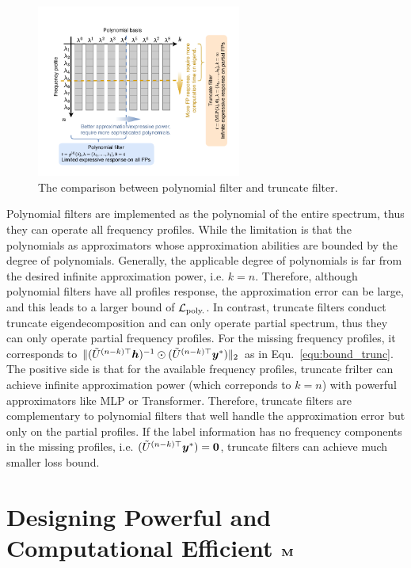 \documentclass{article} %
\begin{document}
	\begin{figure}[h]
		\centering
		\includegraphics[width=0.6\textwidth]{figure/poly_trunc}
		\caption{The comparison between polynomial filter and truncate filter.}
		\label{fig:spec_expr}
	\end{figure}
	Polynomial filters are implemented as the polynomial of the entire spectrum, thus they can operate all frequency profiles.
	While the limitation is that the polynomials as approximators whose approximation abilities are bounded by the degree of polynomials.
	Generally, the applicable degree of polynomials is far from the desired infinite approximation power, i.e. $k=n$.
	Therefore, although polynomial filters have all profiles response, the approximation error can be large, and this leads to a larger bound of ${\mathcal{L}}_{\textrm{poly.}}$.
	In contrast, truncate filters conduct truncate eigendecomposition and can only operate partial spectrum, thus they can only operate partial frequency profiles.
	For the missing frequency profiles, it corresponds to $\|(\tilde U^{(n-k)\top}{\bm{h}})^{-1}\odot(\tilde U^{(n-k)\top}{\bm{y}}^*)\|_2$ as in Equ.~\ref{equ:bound_trunc}.
	The positive side is that for the available frequency profiles, truncate frilter can achieve infinite approximation power (which correponds to $k=n$) with powerful approximators like MLP or Transformer.
	Therefore, truncate filters are complementary to polynomial filters that well handle the approximation error but only on the partial profiles.
	If the label information has no frequency components in the missing profiles, i.e. $(\tilde U^{(n-k)\top}{\bm{y}}^*)=\mathbf 0$, truncate filters can achieve much smaller loss bound.
	
	
	
	\section{Designing Powerful and Computational Efficient ${\mathbf{M}}$}
	
\end{document}
